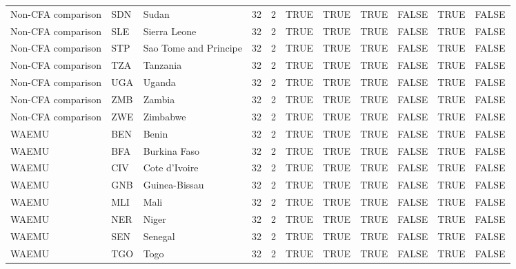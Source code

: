 \begin{table}
\begin{tabular}[t]{lllrrllllll}
Non-CFA comparison & SDN & Sudan & 32 & 2 & TRUE & TRUE & TRUE & FALSE & TRUE & FALSE\\
Non-CFA comparison & SLE & Sierra Leone & 32 & 2 & TRUE & TRUE & TRUE & FALSE & TRUE & FALSE\\
Non-CFA comparison & STP & Sao Tome and Principe & 32 & 2 & TRUE & TRUE & TRUE & FALSE & TRUE & FALSE\\
\addlinespace
Non-CFA comparison & TZA & Tanzania & 32 & 2 & TRUE & TRUE & TRUE & FALSE & TRUE & FALSE\\
Non-CFA comparison & UGA & Uganda & 32 & 2 & TRUE & TRUE & TRUE & FALSE & TRUE & FALSE\\
Non-CFA comparison & ZMB & Zambia & 32 & 2 & TRUE & TRUE & TRUE & FALSE & TRUE & FALSE\\
Non-CFA comparison & ZWE & Zimbabwe & 32 & 2 & TRUE & TRUE & TRUE & FALSE & TRUE & FALSE\\
WAEMU & BEN & Benin & 32 & 2 & TRUE & TRUE & TRUE & FALSE & TRUE & FALSE\\
\addlinespace
WAEMU & BFA & Burkina Faso & 32 & 2 & TRUE & TRUE & TRUE & FALSE & TRUE & FALSE\\
WAEMU & CIV & Cote d'Ivoire & 32 & 2 & TRUE & TRUE & TRUE & FALSE & TRUE & FALSE\\
WAEMU & GNB & Guinea-Bissau & 32 & 2 & TRUE & TRUE & TRUE & FALSE & TRUE & FALSE\\
WAEMU & MLI & Mali & 32 & 2 & TRUE & TRUE & TRUE & FALSE & TRUE & FALSE\\
WAEMU & NER & Niger & 32 & 2 & TRUE & TRUE & TRUE & FALSE & TRUE & FALSE\\
\addlinespace
WAEMU & SEN & Senegal & 32 & 2 & TRUE & TRUE & TRUE & FALSE & TRUE & FALSE\\
WAEMU & TGO & Togo & 32 & 2 & TRUE & TRUE & TRUE & FALSE & TRUE & FALSE\\
\bottomrule
\end{tabular}
\end{table}